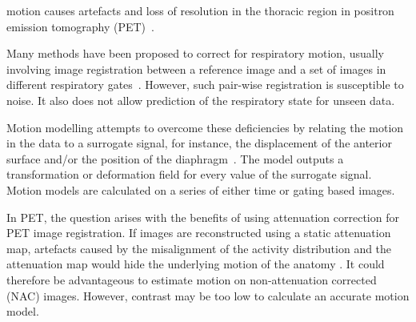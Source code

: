 \documentclass[9pt]{IEEEtran}
\begin{document}
 motion causes artefacts and loss of resolution in the thoracic region in positron emission tomography (PET)~\cite{Nehmeh2008}. %

Many methods have been proposed to correct for respiratory motion, usually involving image registration between a reference image and a set of images in different respiratory gates~\cite{Oliveira2014}. However, such pair-wise registration is susceptible to noise. It also does not allow prediction of the respiratory state for unseen data.

Motion modelling attempts to overcome these deficiencies by relating the motion in the data to a surrogate signal, for instance, the displacement of the anterior surface and/or the position of the diaphragm~\cite{McClelland2013}.
The model outputs a transformation or deformation field for every value of the surrogate signal. Motion models are calculated on a series of either time or gating based images.

In PET, the question arises with the benefits of using attenuation correction for PET image registration. If images are reconstructed using a static attenuation map,  artefacts caused by the misalignment of the activity distribution and the attenuation map would hide the underlying motion of the anatomy \cite{Bousse2016}. It could therefore be advantageous to estimate motion on non-attenuation corrected (NAC) images. However, contrast may be too low to calculate an accurate motion model. 


\end{document}
